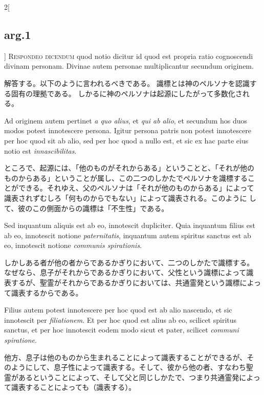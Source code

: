 \documentclass[paper=a4paper,fontsize=10pt,jafontsize=9pt,titlepage]{jlreq}
\begin{document}
\begin{paracol}{2}[\subsection{arg.1}]
{\scshape Respondeo dicendum} quod notio dicitur id quod est propria ratio
cognoscendi divinam personam. Divinae autem personae multiplicantur
secundum originem.

\switchcolumn

解答する。以下のように言われるべきである。
識標とは神のペルソナを認識する固有の理拠である。
しかるに神のペルソナは起源にしたがって多数化される。

\switchcolumn*

Ad originem autem pertinet {\itshape a quo alius}, et {\itshape qui ab
alio}, et secundum hos duos modos potest innotescere persona. Igitur
persona patris non potest innotescere per hoc quod sit ab alio, sed
per hoc quod a nullo est, et sic ex hac parte eius notio est
{\itshape innascibilitas}.

\switchcolumn

ところで、起源には、「他のものがそれからある」ということと、「それが他の
ものからある」ということが属し、この二つのしかたでペルソナを識標するこ
とができる。それゆえ、父のペルソナは「それが他のものからある」によって
 識表されずむしろ「何ものからでもない」によって識表される。このように
 して、彼のこの側面からの識標は「不生性」である。

\switchcolumn*

Sed inquantum aliquis est ab eo, innotescit
dupliciter. Quia inquantum filius est ab eo, innotescit notione
{\itshape paternitatis}, inquantum autem spiritus sanctus est ab eo, innotescit
notione {\itshape communis spirationis}.

\switchcolumn

しかしある者が他の者からであるかぎりにおいて、二つのしかたで識標する。
なぜなら、息子がそれからであるかぎりにおいて、父性という識標によって識
表するが、聖霊がそれからであるかぎりにおいては、共通霊発という識標によっ
て識表するからである。

\switchcolumn*

Filius autem potest innotescere per hoc
quod est ab alio nascendo, et sic innotescit per {\itshape filiationem}. Et per
hoc quod est alius ab eo, scilicet spiritus sanctus, et per hoc
innotescit eodem modo sicut et pater, scilicet {\itshape communi
spiratione}.

\switchcolumn

他方、息子は他のものから生まれることによって識表することができるが、そ
のようにして、息子性によって識表する。そして、彼から他の者、すなわち聖
霊があるということによって、そして父と同じしかたで、つまり共通霊発によっ
て識表することによっても（識表する）。


\end{paracol}
\end{document}
